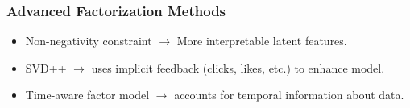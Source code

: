 \documentclass{beamer}
\begin{document}
\begin{frame}
  \frametitle{Advanced Factorization Methods}
  \begin{itemize}
    \item Non-negativity constraint $\rightarrow$ More interpretable latent features. \vspace{2mm} 
    \item SVD++ $\rightarrow$ uses implicit feedback (clicks, likes, etc.) to enhance model. \vspace{2mm}
      \item Time-aware factor model $\rightarrow$ accounts for temporal information about data.
  \end{itemize}
\end{frame}
\end{document}
